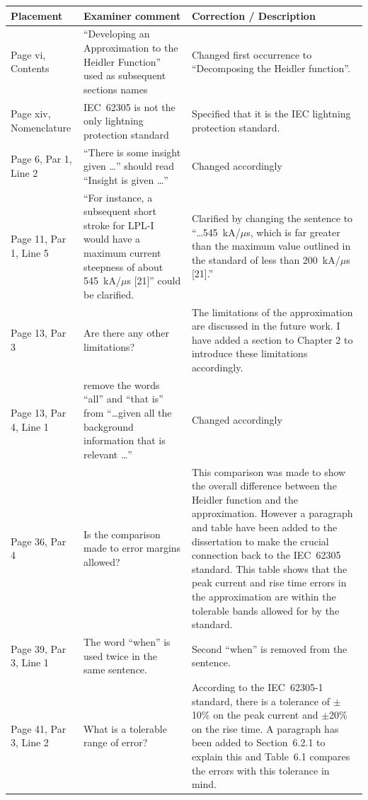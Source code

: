 \documentclass[11pt,a4paper]{letter} %
\begin{document}
\begin{tabularx}{6.5in}{X|p{}|p{}}
	\textbf{Placement} & \textbf{Examiner comment} & \textbf{Correction / Description} \\ \hline
	\endhead
	Page vi, Contents & ``Developing an Approximation to the Heidler Function'' used as subsequent sections names & Changed first occurrence to ``Decomposing the Heidler function''.  \\ \hline
	Page xiv, Nomenclature & IEC~62305 is not the only lightning protection standard & Specified that it is the IEC lightning protection standard. \\ \hline
	Page 6, Par 1, Line 2 & ``There is some insight given \ldots'' should read ``Insight is given \ldots'' & Changed accordingly \\ \hline
	Page 11, Par 1, Line 5 & ``For instance, a subsequent short stroke for LPL-I would have a maximum current steepness of about 545~kA/$\mu$s [21]'' could be clarified. & Clarified by changing the sentence to ``\ldots 545~kA/$\mu$s, which is far greater than the maximum value outlined in the standard of less than 200~kA/$\mu$s [21].'' \\ \hline
	Page 13, Par 3 & Are there any other limitations? & The limitations of the approximation are discussed in the future work. I have added a section to Chapter 2 to introduce these limitations accordingly. \\ \hline
	Page 13, Par 4, Line 1 & remove the words ``all'' and ``that is'' from ``\ldots given all the background information that is relevant \ldots'' & Changed accordingly \\ \hline
	Page 36, Par 4 & Is the comparison made to error margins allowed? & This comparison was made to show the overall difference between the Heidler function and the approximation. However a paragraph and table have been added to the dissertation to make the crucial connection back to the IEC~62305 standard. This table shows that the peak current and rise time errors in the approximation are within the tolerable bands allowed for by the standard. \\ \hline
	Page 39, Par 3, Line 1 & The word ``when'' is used twice in the same sentence. & Second ``when'' is removed from the sentence. \\ \hline
	Page 41, Par 3, Line 2 & What is a tolerable range of error? & According to the IEC~62305-1 standard, there is a tolerance of $\pm$10\% on the peak current and $\pm$20\% on the rise time. A paragraph has been added to Section~6.2.1 to explain this and Table~6.1 compares the errors with this tolerance in mind. \\ \hline

\end{tabularx}
\end{document}

